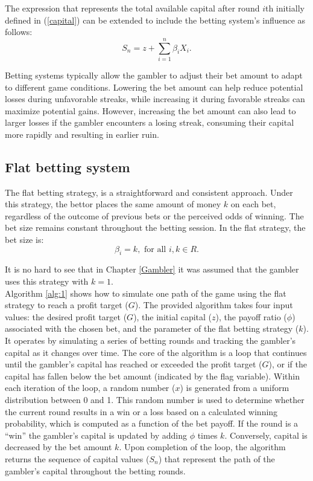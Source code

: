 \documentclass[11pt,twoside]{article}
\numberwithin{Theorem}{section}
\numberwithin{Definition}{section}
\numberwithin{Lemma}{section}
\numberwithin{Algorithm}{section}
\numberwithin{equation}{section}
\begin{document}
The expression that represents the total available capital after round $i$th initially defined in (\ref{capital}) can be extended to include the betting system's influence as follows:\\
\begin{equation}\label{capital_2}
    S_{n} = z + \sum_{i=1}^{n}\beta_{i}X_{i}.
\end{equation}

Betting systems typically allow the gambler to adjust their bet amount to adapt to different game conditions. Lowering the bet amount can help reduce potential losses during unfavorable streaks, while increasing it during favorable streaks can maximize potential gains. However, increasing the bet amount can also lead to larger losses if the gambler encounters a losing streak, consuming their capital more rapidly and resulting in earlier ruin.

\subsection{Flat betting system}

The flat betting strategy, is a straightforward and consistent approach. Under this strategy, the bettor places the same amount of money $k$ on each bet, regardless of the outcome of previous bets or the perceived odds of winning. The bet size remains constant throughout the betting session. In the flat strategy, the bet size is:
\begin{equation}
    \beta_{i} = k, \text{ for all } i, k\in R. 
\end{equation}

It is no hard to see that in Chapter \ref{Gambler} it was assumed that the gambler uses this strategy with $k= 1$.\\

Algorithm \ref{alg:1} shows how to simulate one path of the game using the flat strategy to reach a profit target ($G$). The provided algorithm takes four input values: the desired profit target ($G$), the initial capital ($z$), the payoff ratio ($\phi$) associated with the chosen bet, and the parameter of the flat betting strategy ($k$). It operates by simulating a series of betting rounds and tracking the gambler's capital as it changes over time. The core of the algorithm is a loop that continues until the gambler's capital has reached or exceeded the profit target ($G$), or if the capital has fallen below the bet amount (indicated by the flag variable). Within each iteration of the loop, a random number ($x$) is generated from a uniform distribution between 0 and 1. This random number is used to determine whether the current round results in a win or a loss based on a calculated winning probability, which is computed as a function of the bet payoff. If the round is a “win” the gambler's capital is updated by adding $\phi$ times $k$. Conversely, capital is decreased by the bet amount $k$. Upon completion of the loop, the algorithm returns the sequence of capital values ($S_n$) that represent the path of the gambler's capital throughout the betting rounds.
\end{document}
